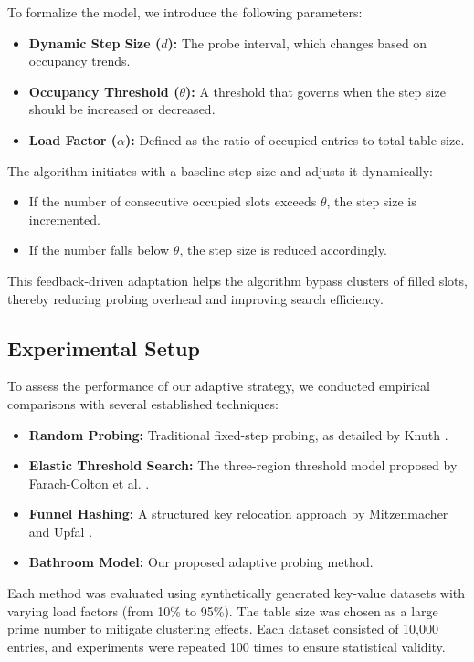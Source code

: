 \documentclass[letterpaper]{article}
\begin{document}
To formalize the model, we introduce the following parameters:
\begin{itemize}
    \item \textbf{Dynamic Step Size ($d$):} The probe interval, which changes based on occupancy trends.
    \item \textbf{Occupancy Threshold ($\theta$):} A threshold that governs when the step size should be increased or decreased.
    \item \textbf{Load Factor ($\alpha$):} Defined as the ratio of occupied entries to total table size.
\end{itemize}

The algorithm initiates with a baseline step size and adjusts it dynamically:
\begin{itemize}
    \item If the number of consecutive occupied slots exceeds $\theta$, the step size is incremented.
    \item If the number falls below $\theta$, the step size is reduced accordingly.
\end{itemize}

This feedback-driven adaptation helps the algorithm bypass clusters of filled slots, thereby reducing probing overhead and improving search efficiency.

\subsection{Experimental Setup}

To assess the performance of our adaptive strategy, we conducted empirical comparisons with several established techniques:
\begin{itemize}
    \item \textbf{Random Probing:} Traditional fixed-step probing, as detailed by Knuth \cite{knuth1998}.
    \item \textbf{Elastic Threshold Search:} The three-region threshold model proposed by Farach-Colton et al. \cite{farach2024}.
    \item \textbf{Funnel Hashing:} A structured key relocation approach by Mitzenmacher and Upfal \cite{mitzenmacher2005}.
    \item \textbf{Bathroom Model:} Our proposed adaptive probing method.
\end{itemize}

Each method was evaluated using synthetically generated key-value datasets with varying load factors (from 10\% to 95\%). The table size was chosen as a large prime number to mitigate clustering effects. Each dataset consisted of 10{,}000 entries, and experiments were repeated 100 times to ensure statistical validity.
\end{document}
